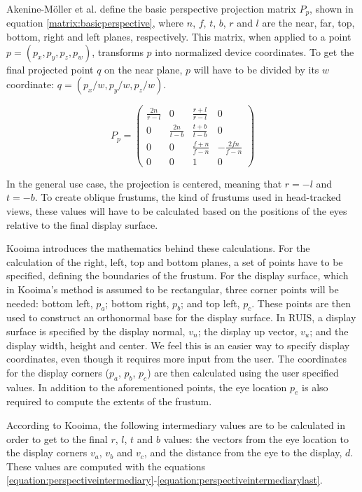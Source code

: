 \documentclass[12pt,a4paper,oneside,pdftex]{report}
\begin{document}
Akenine-Möller et al. \cite{RTR3} define the basic perspective projection matrix $P_p$, shown in equation \eqref{matrix:basicperspective}, where $n$, $f$, $t$, $b$, $r$ and $l$ are the near, far, top, bottom, right and left planes, respectively. This matrix, when applied to a point $p = (p_x, p_y, p_z, p_w)$, transforms $p$ into normalized device coordinates. To get the final projected point $q$ on the near plane, $p$ will have to be divided by its $w$ coordinate: $q = (p_x/w, p_y/w, p_z/w)$.

\begin{equation}
\label{matrix:basicperspective}
P_p = \begin{pmatrix}
  \frac{2n}{r-l} & 0 & \frac{r+l}{r-l} & 0 \\[0.3em]
  0 & \frac{2n}{t-b} & \frac{t+b}{t-b} & 0 \\[0.3em]
  0 & 0 & \frac{f+n}{f-n} & - \frac{2fn}{f-n} \\[0.3em]
  0 & 0 & 1 & 0
 \end{pmatrix}
 \end{equation}
 
In the general use case, the projection is centered, meaning that $r = -l$ and $t = -b$. To create oblique frustums, the kind of frustums used in head-tracked views, these values will have to be calculated based on the positions of the eyes relative to the final display surface. 

Kooima \cite{KooimaPerspective} introduces the mathematics behind these calculations. For the calculation of the right, left, top and bottom planes, a set of points have to be specified, defining the boundaries of the frustum. For the display surface, which in Kooima's method is assumed to be rectangular, three corner points will be needed: bottom left, $p_a$; bottom right, $p_b$; and top left, $p_c$. These points are then used to construct an orthonormal base for the display surface. In RUIS, a display surface is specified by the display normal, $v_n$; the display up vector, $v_u$; and the display width, height and center. We feel this is an easier way to specify display coordinates, even though it requires more input from the user. The coordinates for the display corners ($p_a$, $p_b$, $p_c$) are then calculated using the user specified values. In addition to the aforementioned points, the eye location $p_e$ is also required to compute the extents of the frustum.

According to Kooima, the following intermediary values are to be calculated in order to get to the final $r$, $l$, $t$ and $b$ values: the vectors from the eye location to the display corners $v_a$, $v_b$ and $v_c$, and the distance from the eye to the display, $d$. These values are computed with the equations \eqref{equation:perspectiveintermediary}-\eqref{equation:perspectiveintermediarylast}.
\end{document}
